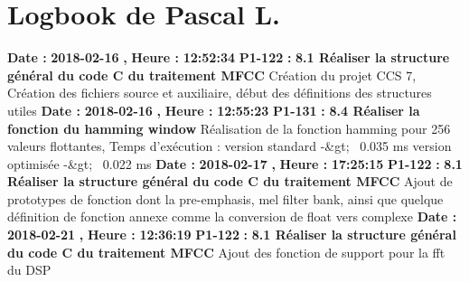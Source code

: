 \documentclass{article}%
\begin{document}
\section{Logbook de Pascal L.}%
\textbf{Date : }%
\textbf{2018{-}02{-}16}%
\textbf{,}%
\textbf{ Heure : }%
\textbf{12:52:34}%
\newline%
%
\textbf{P1{-}122 }%
\textbf{ : }%
\textbf{ 8.1 Réaliser la structure général du code C du traitement MFCC}%
\newline%
\newline%
%
Création du projet CCS 7,\newline%
Création des fichiers source et auxiliaire, début des définitions des structures utiles\newline%
\newline%
%
\textbf{Date : }%
\textbf{2018{-}02{-}16}%
\textbf{,}%
\textbf{ Heure : }%
\textbf{12:55:23}%
\newline%
%
\textbf{P1{-}131 }%
\textbf{ : }%
\textbf{ 8.4 Réaliser la fonction du hamming window}%
\newline%
\newline%
%
Réalisation de la fonction hamming pour 256 valeurs flottantes,\newline%
Temps d'exécution :\newline%
version standard {-}\&gt;~ 0.035 ms\newline%
version optimisée {-}\&gt;~ 0.022 ms\newline%
\newline%
%
\textbf{Date : }%
\textbf{2018{-}02{-}17}%
\textbf{,}%
\textbf{ Heure : }%
\textbf{17:25:15}%
\newline%
%
\textbf{P1{-}122 }%
\textbf{ : }%
\textbf{ 8.1 Réaliser la structure général du code C du traitement MFCC}%
\newline%
\newline%
%
Ajout de prototypes de fonction dont la pre{-}emphasis, mel filter bank, ainsi que quelque définition de fonction annexe comme la conversion de float vers complexe\newline%
\newline%
%
\textbf{Date : }%
\textbf{2018{-}02{-}21}%
\textbf{,}%
\textbf{ Heure : }%
\textbf{12:36:19}%
\newline%
%
\textbf{P1{-}122 }%
\textbf{ : }%
\textbf{ 8.1 Réaliser la structure général du code C du traitement MFCC}%
\newline%
\newline%
%
Ajout des fonction de support pour la fft du DSP\newline%
\end{document}
